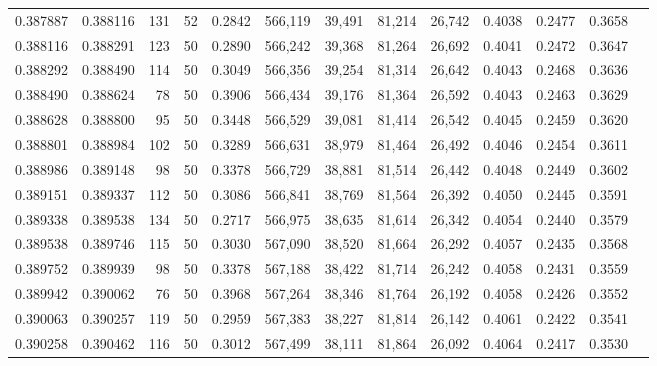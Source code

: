 \begin{tabular}{rrrrrrrrrrrrr}
0.387887 & 0.388116 &   131 &  52 &                                     0.2842 & 566,119 &  39,491 &  81,214 &  26,742 & 0.4038 & 0.2477 & 0.3658 \\
0.388116 & 0.388291 &   123 &  50 &                                     0.2890 & 566,242 &  39,368 &  81,264 &  26,692 & 0.4041 & 0.2472 & 0.3647 \\
0.388292 & 0.388490 &   114 &  50 &                                     0.3049 & 566,356 &  39,254 &  81,314 &  26,642 & 0.4043 & 0.2468 & 0.3636 \\
0.388490 & 0.388624 &    78 &  50 &                                     0.3906 & 566,434 &  39,176 &  81,364 &  26,592 & 0.4043 & 0.2463 & 0.3629 \\
0.388628 & 0.388800 &    95 &  50 &                                     0.3448 & 566,529 &  39,081 &  81,414 &  26,542 & 0.4045 & 0.2459 & 0.3620 \\
0.388801 & 0.388984 &   102 &  50 &                                     0.3289 & 566,631 &  38,979 &  81,464 &  26,492 & 0.4046 & 0.2454 & 0.3611 \\
0.388986 & 0.389148 &    98 &  50 &                                     0.3378 & 566,729 &  38,881 &  81,514 &  26,442 & 0.4048 & 0.2449 & 0.3602 \\
0.389151 & 0.389337 &   112 &  50 &                                     0.3086 & 566,841 &  38,769 &  81,564 &  26,392 & 0.4050 & 0.2445 & 0.3591 \\
0.389338 & 0.389538 &   134 &  50 &                                     0.2717 & 566,975 &  38,635 &  81,614 &  26,342 & 0.4054 & 0.2440 & 0.3579 \\
0.389538 & 0.389746 &   115 &  50 &                                     0.3030 & 567,090 &  38,520 &  81,664 &  26,292 & 0.4057 & 0.2435 & 0.3568 \\
0.389752 & 0.389939 &    98 &  50 &                                     0.3378 & 567,188 &  38,422 &  81,714 &  26,242 & 0.4058 & 0.2431 & 0.3559 \\
0.389942 & 0.390062 &    76 &  50 &                                     0.3968 & 567,264 &  38,346 &  81,764 &  26,192 & 0.4058 & 0.2426 & 0.3552 \\
0.390063 & 0.390257 &   119 &  50 &                                     0.2959 & 567,383 &  38,227 &  81,814 &  26,142 & 0.4061 & 0.2422 & 0.3541 \\
0.390258 & 0.390462 &   116 &  50 &                                     0.3012 & 567,499 &  38,111 &  81,864 &  26,092 & 0.4064 & 0.2417 & 0.3530 \\

\end{tabular}
